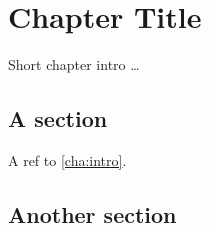 \chapter{Chapter Title}
\label{cha:title}

Short chapter intro \ldots

\section{A section}

A ref to \ref{cha:intro}.



\section{Another section}




